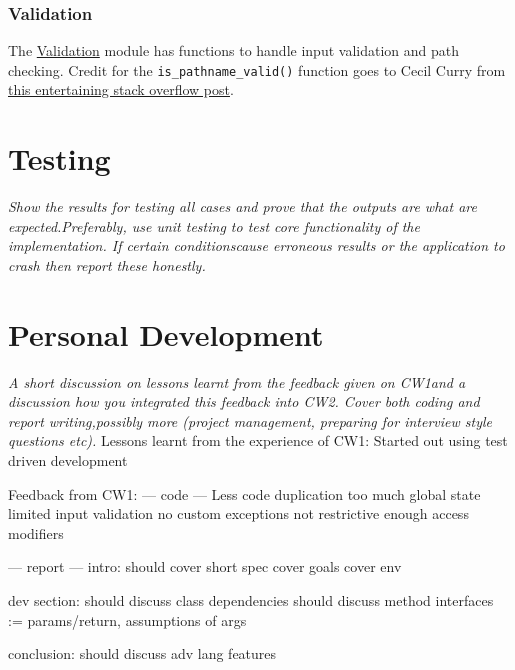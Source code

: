 \documentclass[11pt]{article}
\newcommand{\code}[1]{\colorbox{light-gray}{\texttt{#1}}}
\begin{document}
\subsubsection{Validation}
The \href{https://www2.macs.hw.ac.uk/~sf52/DocuTrace/html/DocuTrace.Utils.html#module-DocuTrace.Utils.Validation}{Validation} module has functions to handle input validation and path checking. Credit for the \code{is\_pathname\_valid()} function goes to Cecil Curry from \href{https://stackoverflow.com/questions/9532499/check-whether-a-path-is-valid-in-python-without-creating-a-file-at-the-paths-ta}{this entertaining stack overflow post}.


\section{Testing}
\emph{Show  the  results  for  testing  all  cases  and  prove  that  the  outputs  are  what  are  expected.Preferably,  use  unit  testing  to  test  core  functionality  of  the  implementation.   If  certain  conditionscause erroneous results or the application to crash then report these honestly.}

\section{Personal Development}
\emph{A short discussion on lessons learnt from the feedback given on CW1and a discussion how you integrated this feedback into CW2.  Cover both coding and report writing,possibly more (project management, preparing for interview style questions etc).}
Lessons learnt from the experience of CW1:
Started out using test driven development


Feedback from CW1:
 --- code ---
Less code duplication
too much global state
limited input validation
no custom exceptions
not restrictive enough access modifiers

--- report ---
intro:
    should cover short spec
    cover goals
    cover env

dev section:
    should discuss class dependencies
    should discuss method interfaces := params/return, assumptions of args

conclusion:
    should discuss adv lang features
\end{document}

